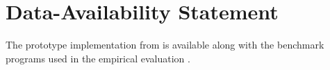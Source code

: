 \documentclass[acmsmall, nonacm, screen,svgnames,x11names]{acmart}\settopmatter{}
\theoremstyle{acmdefinition}
\begin{document}
	
	

	
	

	
	
	
	


	
	

	
	

	
	
	
	
	\newpage
	
	
	\section*{Data-Availability Statement}
	The prototype implementation from  is available along with the benchmark programs used in the empirical evaluation \cite{nodice_artefact}.

	
	
	
	
	

	

	 
\end{document}
